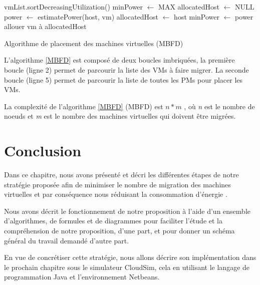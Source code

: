 \begin{onehalfspace}
\begin{algorithm}[!h]
\LinesNumbered
{} 
\BlankLine
vmList.sortDecreasingUtilization()\;
{
	minPower $\leftarrow$ MAX\;
	allocatedHost $\leftarrow$ NULL\;
	{
		{
			power $\leftarrow$ estimatePower(host, vm)\;
			{
				allocatedHost $\leftarrow$ host\;
				minPower $\leftarrow$ power\;
			}	
		}
	}
	{
		allouer vm à allocatedHost\;
	}
}
\;
\caption{Algorithme de placement des machines virtuelles (MBFD)}
\label{MBFD}
\end{algorithm}
L’algorithme \ref{MBFD} est composé de deux boucles imbriquées, la première boucle (ligne 2) permet de parcourir la liste des VMs à faire migrer. La seconde boucle (ligne 5) permet de parcourir la liste de toutes les PMs pour placer les VMs.

La complexité de l'algorithme \ref{MBFD} (MBFD) est $n*m$ , où \textit{n} est le nombre de noeuds et \textit{m} est le nombre des machines virtuelles qui doivent être migrées.
\end{onehalfspace}
\clearpage
\section{Conclusion}
\begin{onehalfspace}
Dans ce chapitre, nous avons présenté et décri les différentes étapes de notre stratégie proposée afin de minimiser le nombre de migration des machines virtuelles et par conséquence nous réduisant la consommation d’énergie .\medskip

Nous avons décrit le fonctionnement de notre proposition à l’aide d’un ensemble d'algorithmes, de formules et de diagrammes pour faciliter l'étude et la compréhension de notre proposition, d'une part, et pour donner un schéma général du travail demandé d'autre part.\medskip

En vue de concrétiser cette stratégie, nous allons décrire son implémentation dans le prochain chapitre sous le simulateur CloudSim, cela en utilisant le langage de programmation Java et l'environnement Netbeans.\medskip
\end{onehalfspace}

